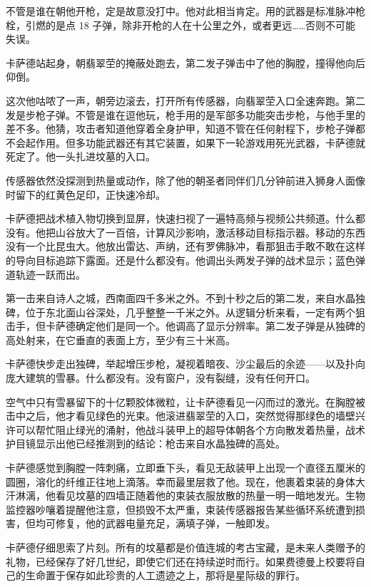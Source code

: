 \documentclass[AutoFakeBold=true]{book}
\begin{document}
不管是谁在朝他开枪，定是故意没打中。他对此相当肯定。用的武器是标准脉冲枪栓，引燃的是点 18 子弹，除非开枪的人在十公里之外，或者更远……否则不可能失误。

卡萨德站起身，朝翡翠茔的掩蔽处跑去，第二发子弹击中了他的胸膛，撞得他向后仰倒。

这次他咕哝了一声，朝旁边滚去，打开所有传感器，向翡翠茔入口全速奔跑。第二发是步枪子弹。不管是谁在逗他玩，枪手用的是军部多功能突击步枪，与他手里的差不多。他猜，攻击者知道他穿着全身护甲，知道不管在任何射程下，步枪子弹都不会起作用。但多功能武器还有其它装置，如果下一轮游戏用死光武器，卡萨德就死定了。他一头扎进坟墓的入口。

传感器依然没探测到热量或动作，除了他的朝圣者同伴们几分钟前进入狮身人面像时留下的红黄色足印，正快速冷却。

卡萨德把战术植入物切换到显屏，快速扫视了一遍特高频与视频公共频道。什么都没有。他把山谷放大了一百倍，计算风沙影响，激活移动目标指示器。移动的东西没有一个比昆虫大。他放出雷达、声纳，还有罗佛脉冲，看那狙击手敢不敢在这样的导向目标追踪下露面。还是什么都没有。他调出头两发子弹的战术显示；蓝色弹道轨迹一跃而出。

第一击来自诗人之城，西南面四千多米之外。不到十秒之后的第二发，来自水晶独碑，位于东北面山谷深处，几乎整整一千米之外。从逻辑分析来看，一定有两个狙击手，但卡萨德确定他们是同一个。他调高了显示分辨率。第二发子弹是从独碑的高处射来，在它垂直的表面上方，至少有三十米高。

卡萨德快步走出独碑，举起增压步枪，凝视着暗夜、沙尘最后的余迹——以及扑向庞大建筑的雪暴。什么都没有。没有窗户，没有裂缝，没有任何开口。

空气中只有雪暴留下的十亿颗胶体微粒，让卡萨德看见一闪而过的激光。在胸膛被击中{\kaishu 之后}，他才看见绿色的光束。他滚进翡翠茔的入口，突然觉得那绿色的墙壁兴许可以帮忙阻止绿光的涌射，他战斗装甲上的超导体朝各个方向散发着热量，战术护目镜显示出他已经推测到的结论：枪击来自水晶独碑的高处。

卡萨德感觉到胸膛一阵刺痛，立即垂下头，看见无敌装甲上出现一个直径五厘米的圆圈，溶化的纤维正往地上滴落。幸而最里层救了他。现在，他裹着束装的身体大汗淋漓，他看见坟墓的四墙正随着他的束装衣服放散的热量一明一暗地发光。生物监控器吵嚷着提醒他注意，但损毁不太严重，束装传感器报告某些循环系统遭到损害，但均可修复，他的武器电量充足，满填子弹，一触即发。

卡萨德仔细思索了片刻。所有的坟墓都是价值连城的考古宝藏，是未来人类赠予的礼物，已经保存了好几世纪，即使它们还在{\kaishu 持续}逆时而行。如果费德曼上校要将自己的生命置于保存如此珍贵的人工遗迹之上，那将是星际级的罪行。
\end{document}
